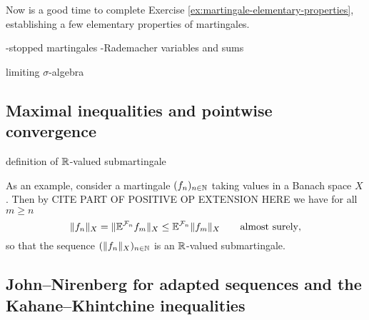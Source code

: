 \begin{rmk}
  Now is a good time to complete Exercise \ref{ex:martingale-elementary-properties}, establishing a few elementary properties of martingales.
\end{rmk}

-stopped martingales
-Rademacher variables and sums

\begin{defn}
  limiting $\sigma$-algebra 
\end{defn}

\begin{thm}
  
\end{thm}

\subsection{Maximal inequalities and pointwise convergence}


\begin{defn}
  definition of $\mathbb{R}$-valued submartingale
\end{defn}

As an example, consider a martingale $(f_n)_{n \in \mathbb{N}}$ taking values in a Banach space $X$.
Then by {\color{red} CITE PART OF POSITIVE OP EXTENSION HERE} we have for all $m \geq n$
\begin{equation*}
  \|f_n\|_X = \|\mathbb{E}^{\mathcal{F}_n} f_m\|_X \leq \mathbb{E}^{\mathcal{F}_n} \|f_m\|_X \qquad \text{almost surely},
\end{equation*}
so that the sequence $(\|f_n\|_X)_{n \in \mathbb{N}}$ is an $\mathbb{R}$-valued submartingale.

\begin{thm}
  
\end{thm}


\begin{thm}
  
\end{thm}



\subsection{John--Nirenberg for adapted sequences and the Kahane--Khintchine inequalities}

